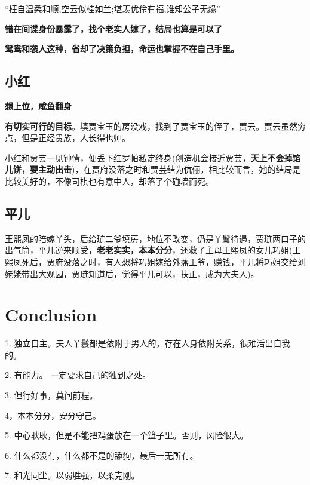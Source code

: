 \documentclass[conference]{IEEEtran}
\begin{document}
\begin{CJK*}{UTF8}{song}
“枉自温柔和顺,空云似桂如兰;堪羡优伶有福,谁知公子无缘”

\textbf{错在间谍身份暴露了，找个老实人嫁了，结局也算是可以了}

\textbf{鸳鸯和袭人这种，省却了决策负担，命运也掌握不在自己手里。}

\subsection{小红}
\textbf{想上位，咸鱼翻身}

\textbf{有切实可行的目标}。填贾宝玉的房没戏，找到了贾宝玉的侄子，贾云。贾云虽然穷点，但是正经贵族，人长得也帅。

小红和贾芸一见钟情，便丢下红罗帕私定终身(创造机会接近贾芸，\textbf{天上不会掉馅儿饼，要主动出击})，在贾府没落之时和贾芸结为伉俪，相比较而言，她的结局是比较美好的，不像司棋也有意中人，却落了个碰墙而死。

\subsection{平儿}
王熙凤的陪嫁丫头，后给琏二爷填房，地位不改变，仍是丫鬟待遇，贾琏两口子的出气筒，平儿逆来顺受，\textbf{老老实实，本本分分}，还救了主母王熙凤的女儿巧姐(王熙凤死后，贾府没落之时，有人想将巧姐嫁给外藩王爷，赚钱，平儿将巧姐交给刘姥姥带出大观园，贾琏知道后，觉得平儿可以，扶正，成为大夫人)。

\section{Conclusion}
1. 独立自主。夫人丫鬟都是依附于男人的，存在人身依附关系，很难活出自我的。

2. 有能力。 一定要求自己的独到之处。

3. 但行好事，莫问前程。

4，本本分分，安分守己。

5. 中心耿耿，但是不能把鸡蛋放在一个篮子里。否则，风险很大。

6. 什么都没有，什么都不是的舔狗，最后一无所有。

7. 和光同尘。以弱胜强，以柔克刚。




%
\end{CJK*}
\end{document}
